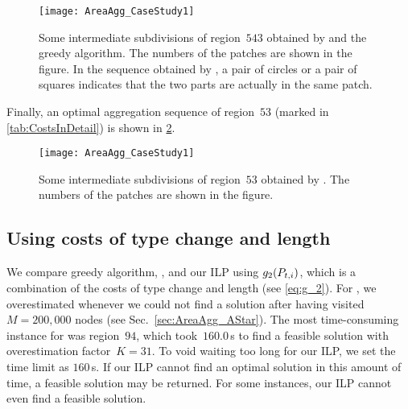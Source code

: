 \begin{figure}[tb]
	\centering
	\texttt{[image: AreaAgg\_CaseStudy1]}
	\caption{Some intermediate subdivisions of region~$543$ 
		obtained by \Astar and the greedy algorithm.
		The numbers of the patches are shown in the figure.
		In the sequence obtained by \Astar, 
		a pair of circles or a pair of squares indicates that
		the two parts are actually in the same patch.
	}
	\label{fig:AreaAgg_CaseStudy1_Rg543}
\end{figure}

Finally, an optimal aggregation sequence of region~$53$
(marked in \tab\ref{tab:CostsInDetail})
is shown in \fig\ref{fig:AreaAgg_CaseStudy1_Rg53}.

\begin{figure}[tb]
	\centering
	\texttt{[image: AreaAgg\_CaseStudy1]}
	\caption{Some intermediate subdivisions of region~$53$ 
		obtained by \Astar.
		The numbers of the patches are shown in the figure.
	}
	\label{fig:AreaAgg_CaseStudy1_Rg53}
\end{figure}





\subsection{Using costs of type change and length}
We compare greedy algorithm, \Astar, and our ILP
using $g_2(P_{t,i})$,
which is a combination of the costs 
of type change and length (see \eq\ref{eq:g_2}).
For \Astar, we overestimated 
whenever we could not find a solution after 
having visited~$M=200{,}000$ nodes (see 
Sec.~\ref{sec:AreaAgg_AStar}).
The most time-consuming instance for \Astar was region~$94$,
which took~$160.0\,$s to find a feasible solution 
with overestimation factor~$K=31$.
To void waiting too long for our ILP,
we set the time limit as $160\,$s.
If our ILP cannot find an optimal solution 
in this amount of time, a feasible solution may be returned.
For some instances, our ILP cannot even 
find a feasible solution.

